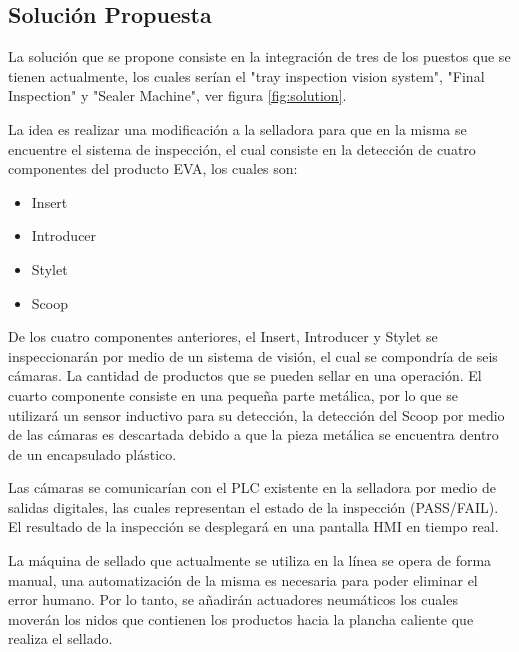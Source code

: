 \documentclass[12pt, twoside, letterpaper]{book}
\begin{document}
\subsection{Soluci\'on Propuesta}

La soluci\'on que se propone consiste en la integraci\'on de tres de los puestos que se tienen actualmente, los cuales ser\'ian el "tray inspection vision system", "Final Inspection" y "Sealer Machine", ver figura \ref{fig:solution}. \par

La idea es realizar una modificaci\'on a la selladora para que en la misma se encuentre el sistema de inspecci\'on, el cual consiste en la detecci\'on de cuatro componentes del producto EVA, los cuales son:

\begin{itemize}

    \item Insert
    \item Introducer
    \item Stylet
    \item Scoop

\end{itemize}

De los cuatro componentes anteriores, el Insert, Introducer y Stylet se inspeccionar\'an por medio de un sistema de visi\'on, el cual se compondr\'ia de seis c\'amaras. La cantidad de productos que se pueden sellar en una operaci\'on. El cuarto componente consiste en una peque\~na parte met\'alica, por lo que se utilizar\'a un sensor inductivo para su detecci\'on, la detecci\'on del Scoop por medio de las c\'amaras es descartada debido a que la pieza met\'alica se encuentra dentro de un encapsulado pl\'astico. \par

Las c\'amaras se comunicar\'ian con el PLC existente en la selladora por medio de salidas digitales, las cuales representan el estado de la inspecci\'on (PASS/FAIL). El resultado de la inspecci\'on se desplegar\'a en una pantalla HMI en tiempo real. \par

La m\'aquina de sellado que actualmente se utiliza en la l\'inea se opera de forma manual, una automatizaci\'on de la misma es necesaria para poder eliminar el error humano. Por lo tanto, se a\~nadir\'an actuadores neum\'aticos los cuales mover\'an los nidos que contienen los productos hacia la plancha caliente que realiza el sellado. \par
\end{document}
